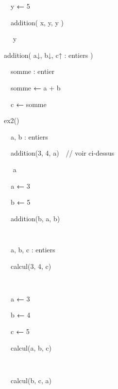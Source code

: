 {\sffamily
{\ \ y
}{\textbf{←}}{ 5}}

{\sffamily
\ \ addition( x, y, y )}

{\sffamily
\ \  y}

{\sffamily
{}}


\bigskip

{\sffamily
{}
addition{(
a}{↓}{,
b}{↓}{,
c}{↑ :}{ entiers )}}

{\sffamily
\ \ somme : entier}

{\sffamily
\ \ somme {\textbf{←}}{
a + b}}

{\sffamily
\ \ c {\textbf{←}}{
somme}}

{\sffamily
{}}


\bigskip

{\sffamily
{} ex2()\ \ }

{\sffamily
\ \ a, b : entiers}

{\sffamily
\ \ addition(3, 4, a)\ \ // voir ci-dessus}

{\sffamily
\ \  a}

{\sffamily
\texttt{\ \ }a {\textbf{←}} 3}

{\sffamily
\ \ b {\textbf{←}} 5}

{\sffamily
\ \ addition(b, a, b)}

{\sffamily
\texttt{\ \ }}

{\sffamily
{}}


\bigskip

{\sffamily
{}}

{\sffamily
{\ \ }a, b, c : entiers\ \ \ \ \ \ \ \ }

{\sffamily
\ \ calcul(3, 4, c)\ \ \ \ \ \ \ \ }

{\sffamily
\ \ }

{\sffamily
{\ \ a
}{\textbf{←}}{
3\ \ \ \ \ \ \ \ }}

{\sffamily
{\ \ b
}{\textbf{←}}{ 4}}

{\sffamily
{\ \ c
}{\textbf{←}}{ 5}}

{\sffamily
\ \ calcul(a, b, c)\ \ \ \ \ \ }

{\sffamily
{\ \ }}

{\sffamily
\ \ calcul(b, c, a)\ \ \ \ }

{\sffamily
{\ \ }}

